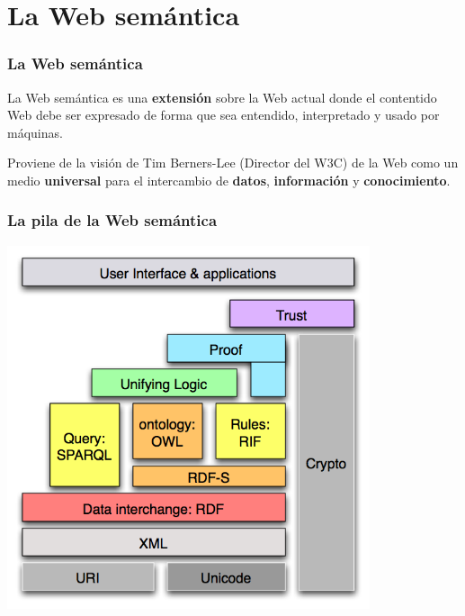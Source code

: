 \documentclass[spanish,notes=hide]{beamer}
\begin{document}
\section{La Web semántica}
\frame
{
  \frametitle{La Web semántica}

  \begin{Large}
    La Web semántica es una \textbf{extensión} sobre la Web actual donde el 
    contentido Web debe ser expresado de forma que sea entendido, interpretado 
    y usado por máquinas.
  \end{Large}
  
  \vspace{1cm}

  \begin{Large}
    Proviene de la visión de Tim Berners-Lee (Director del W3C) de la Web como un
    medio \textbf{universal} para el intercambio de \textbf{datos}, \textbf{información} 
    y \textbf{conocimiento}.
  \end{Large}
}
\frame
{
  \frametitle{La pila de la Web semántica}

  \begin{center}
    \includegraphics[width=0.8\textwidth]{images/semantic-web-stack.png}
  \end{center}

}
\frame
\end{document}

